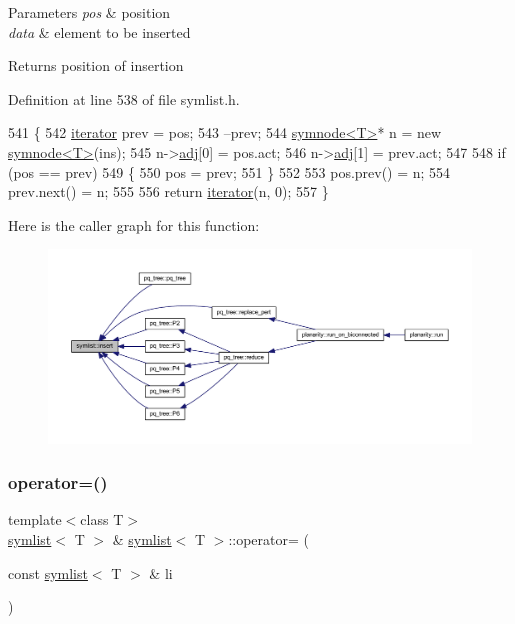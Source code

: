 \begin{DoxyParams}{Parameters}
{\em pos} & position \\
\hline
{\em data} & element to be inserted\\
\hline
\end{DoxyParams}
\begin{DoxyReturn}{Returns}
position of insertion 
\end{DoxyReturn}


Definition at line 538 of file symlist.\+h.


\begin{DoxyCode}
541 \{
542     \mbox{\hyperlink{classsymlist_a66045fbe3d98975e5537092ede8b50df}{iterator}} prev = pos;
543     --prev;
544     \mbox{\hyperlink{structsymnode}{symnode<T>}}* n = \textcolor{keyword}{new} \mbox{\hyperlink{structsymnode}{symnode<T>}}(ins);
545     n->\mbox{\hyperlink{structsymnode_aba7e8f525fb4d85417384a6ccff59241}{adj}}[0] = pos.act;
546     n->\mbox{\hyperlink{structsymnode_aba7e8f525fb4d85417384a6ccff59241}{adj}}[1] = prev.act;
547 
548     \textcolor{keywordflow}{if} (pos == prev)
549     \{
550     pos = prev;
551     \}
552 
553     pos.prev() = n;
554     prev.next() = n;
555 
556     \textcolor{keywordflow}{return} \mbox{\hyperlink{classsymlist_a66045fbe3d98975e5537092ede8b50df}{iterator}}(n, 0);
557 \}
\end{DoxyCode}
Here is the caller graph for this function\+:\nopagebreak
\begin{figure}[H]
\begin{center}
\leavevmode
\includegraphics[width=350pt]{classsymlist_a8b3327b8a33b180bf1eb802856f755c3_icgraph}
\end{center}
\end{figure}
\mbox{\label{classsymlist_aab326eda0f6d3a78f193a249342670bc}} 
\subsubsection{\texorpdfstring{operator=()}{operator=()}}
{\footnotesize\ttfamily template$<$class T$>$ \\
\mbox{\hyperlink{classsymlist}{symlist}}$<$ T $>$ \& \mbox{\hyperlink{classsymlist}{symlist}}$<$ T $>$\+::operator= (\begin{DoxyParamCaption}\item[{const \mbox{\hyperlink{classsymlist}{symlist}}$<$ T $>$ \&}]{li }\end{DoxyParamCaption})}



